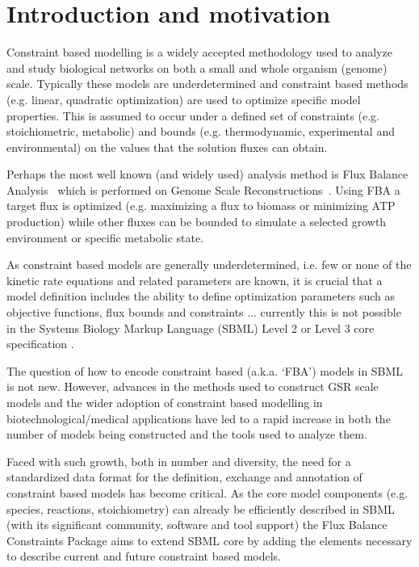 
\section{ Introduction and motivation }
\label{intro}

Constraint based modelling is a widely accepted methodology used to analyze and study biological networks on both a small and whole organism (genome) scale. Typically these models are underdetermined and constraint based methods (e.g. linear, quadratic optimization) are used to optimize specific model properties. This is assumed to occur under a defined set of constraints (e.g. stoichiometric, metabolic) and bounds (e.g. thermodynamic, experimental and environmental) on the values that the solution fluxes can obtain.

Perhaps the most well known (and widely used) analysis method is Flux Balance Analysis~\citep[FBA; ][]{orth_2010} which is performed on Genome Scale Reconstructions~\citep[GSR's; ][]{oberhardt_2009}. Using FBA a target flux is optimized (e.g. maximizing a flux to biomass or minimizing ATP production) while other fluxes can be bounded to simulate a selected growth environment or specific metabolic state.

As constraint based models are generally underdetermined, i.e. few or none of the kinetic rate equations and related parameters are known, it is crucial that a model definition includes the ability to define optimization parameters such as objective functions, flux bounds and constraints ... currently this is not possible in the Systems Biology Markup Language (SBML) Level 2 or Level 3 core specification \citep{sbml, sbml3core}.

The question of how to encode constraint based (a.k.a. `FBA') models in SBML is not new. However, advances in the methods used to construct GSR scale models and the wider adoption of constraint based modelling in biotechnological/medical applications have led to a rapid increase in both the number of models being constructed and the tools used to analyze them.

Faced with such growth, both in number and diversity, the need for a standardized data format for the definition, exchange and annotation of constraint based models has become critical. As the core model components (e.g. species, reactions, stoichiometry) can already be efficiently described in SBML (with its significant community, software and tool support) the Flux Balance Constraints Package aims to extend SBML core by adding the elements necessary to describe current and future constraint based models.


